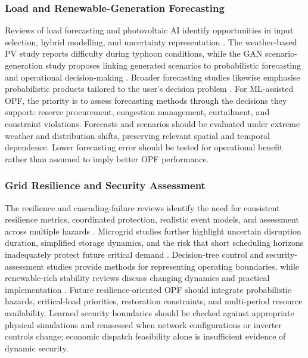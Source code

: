 \documentclass[a4paper,fleqn]{cas-sc}
\begin{document}
    \subsubsection{Load and Renewable-Generation Forecasting}\label{subsubsec:gaps_forecasting}
    
    Reviews of load forecasting and photovoltaic AI identify opportunities in input selection, hybrid modelling, and uncertainty representation \cite{raza2015review,mellit2008artificial}. The weather-based PV study reports difficulty during typhoon conditions, while the GAN scenario-generation study proposes linking generated scenarios to probabilistic forecasting and operational decision-making \cite{opfRef023,chen2018model}. Broader forecasting studies likewise emphasise probabilistic products tailored to the user's decision problem \cite{opfRef062,petropoulos2022forecasting}. For ML-assisted OPF, the priority is to assess forecasting methods through the decisions they support: reserve procurement, congestion management, curtailment, and constraint violations. Forecasts and scenarios should be evaluated under extreme weather and distribution shifts, preserving relevant spatial and temporal dependence. Lower forecasting error should be tested for operational benefit rather than assumed to imply better OPF performance.
    
    \subsubsection{Grid Resilience and Security Assessment}\label{subsubsec:gaps_resilience}
    
    The resilience and cascading-failure reviews identify the need for consistent resilience metrics, coordinated protection, realistic event models, and assessment across multiple hazards \cite{opfRef031,haes2019survey}. Microgrid studies further highlight uncertain disruption duration, simplified storage dynamics, and the risk that short scheduling horizons inadequately protect future critical demand \cite{opfRef057,opfRef078}. Decision-tree control and security-assessment studies provide methods for representing operating boundaries, while renewable-rich stability reviews discuss changing dynamics and practical implementation \cite{opfRef015,zhang2022data,ali2025power}. Future resilience-oriented OPF should integrate probabilistic hazards, critical-load priorities, restoration constraints, and multi-period resource availability. Learned security boundaries should be checked against appropriate physical simulations and reassessed when network configurations or inverter controls change; economic dispatch feasibility alone is insufficient evidence of dynamic security.
    
\end{document}
